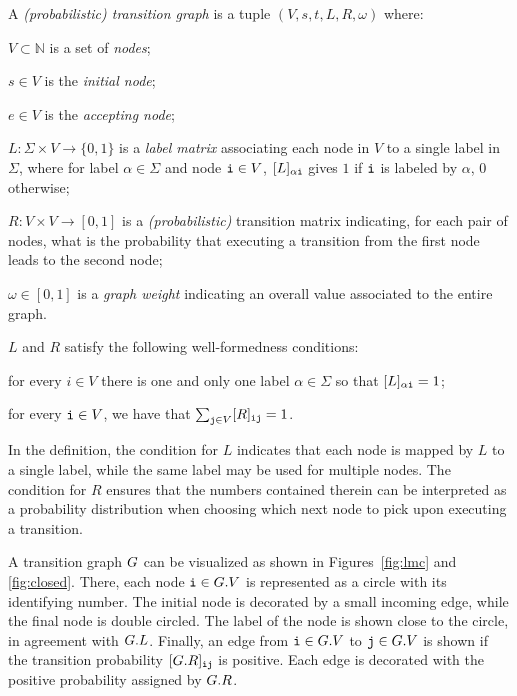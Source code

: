 \begin{definition} A \emph{(probabilistic) transition graph} is a tuple $(V,s,t,L,R,\omega)$ where:
  \begin{inparaenum}[\itshape (i)]
    \item $V \subset \mathbb{N}$ is a set of \emph{nodes};    
    \item $s\in V$ is the \emph{initial node}; 
    \item $e\in V$ is the \emph{accepting node};
    \item $L: \Sigma \times V \rightarrow \{0,1\}$ is a \emph{label matrix} associating each node in $V$ to a single label in $\Sigma$, where for label $\alpha \in \Sigma$ and node $\textnormal{\texttt{i}} \in V$, $[L]_{\alpha\textnormal{\texttt{i}}}$ gives $1$ if $\textnormal{\texttt{i}}$ is labeled by $\alpha$, $0$ otherwise;
    \item $R: V \times V \rightarrow [0,1]$ is a \emph{(probabilistic)} transition matrix indicating, for each pair of nodes, what is the probability that executing a transition from the first node leads to the second node;
    \item $\omega \in [0,1]$ is a \emph{graph weight} indicating an overall value associated to the entire graph.   
  \end{inparaenum}
$L$ and $R$ satisfy the following well-formedness conditions:
\begin{inparaenum}[\itshape (i)]
\item for every $i \in V$ there is one and only one label $\alpha \in \Sigma$ so   that $[L]_{\alpha\textnormal{\texttt{i}}}=1$;
\item  for  every $\textnormal{\texttt{i}} \in V$, we have that $\sum_{\textnormal{\texttt{j}}\in V}[R]_{\textnormal{\texttt{ij}}}=1$. 
\end{inparaenum}
\end{definition}
In the definition, the condition for $L$ indicates that each node is mapped by $L$ to a single label, while the same label may be used for multiple nodes. The condition for $R$ ensures that the numbers contained therein can be interpreted as a probability distribution when choosing which next node to pick upon executing a transition.

A transition graph $G$ can be visualized as shown in Figures~\eqref{fig:lmc} and \eqref{fig:closed}. There, each node $\textnormal{\texttt{i}} \in G.V$ is  represented as a circle with its identifying number. The initial node is decorated by a small incoming edge, while the final node is double circled. The label of the node is shown close to the circle, in agreement with $G.L$. Finally, an edge from $\textnormal{\texttt{i}} \in G.V$ to $\textnormal{\texttt{j}} \in G.V$ is shown if the transition probability $[G.R]_{\textnormal{\texttt{i}}\textnormal{\texttt{j}}}$ is positive. Each edge is decorated with the positive probability assigned by $G.R$. 

